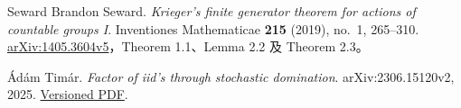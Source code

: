 \documentclass[UTF8,zihao=-4,a4paper]{ctexart}
\numberwithin{equation}{section}
\begin{document}
\begin{thebibliography}{Seward}
 Brandon Seward. \emph{Krieger's finite generator theorem for actions of countable groups I}. Inventiones Mathematicae \textbf{215} (2019), no.~1, 265--310. \href{https://arxiv.org/pdf/1405.3604v5}{arXiv:1405.3604v5}，Theorem 1.1、Lemma 2.2 及 Theorem 2.3。

 Ádám Timár. \emph{Factor of iid's through stochastic domination}. arXiv:2306.15120v2, 2025. \href{https://arxiv.org/pdf/2306.15120v2}{Versioned PDF}.

\end{thebibliography}
\end{document}
